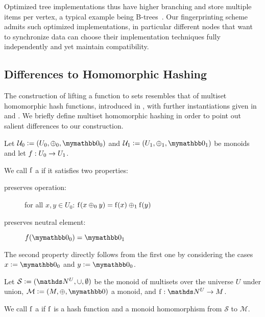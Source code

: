 Optimized tree implementations thus have higher branching and store multiple items per vertex, a typical example being B-trees~\cite{bayer2002organization}. Our fingerprinting scheme admits such optimized implementations, in particular different nodes that want to synchronize data can choose their implementation techniques fully independently and yet maintain compatibility.

\subsection{Differences to Homomorphic Hashing}

The construction of lifting a function to sets resembles that of multiset homomorphic hash functions, introduced in \cite{clarke2003incremental}, with further instantiations given in \cite{cathalo2009comparing} and \cite{maitin2017elliptic}. We briefly define multiset homomorphic hashing in order to point out salient differences to our construction.

\begin{definition}
Let $\mathcal{U}_0 \defeq (U_0, \groupaddsym_0, \neutraladd_0)$ and $\mathcal{U}_1 \defeq (U_1, \groupaddsym_1, \neutraladd_1)$ be monoids and let ${f}: {U_0} \rightarrow {U_1}$.

We call $\operatorname{f}$ a  if it satisfies two properties:

\begin{description}
  \item[preserves operation:] for all $x, y \in U_0$: $\operatorname{f}(x \oplus_0 y) = \operatorname{f}(x) \oplus_1 \operatorname{f}(y)$
  \item[preserves neutral element:] $f(\neutraladd_0) = \neutraladd_1$
\end{description}

The second property directly follows from the first one by considering the cases $x \defeq \neutraladd_0$ and $y \defeq \neutraladd_0$.
\end{definition}

\begin{definition}
Let $\mathcal{S} \defeq (\N^U, \cup, \emptyset)$ be the monoid of multisets over the universe $U$ under union, $\mathcal{M} \defeq (M, \groupaddsym, \neutraladd)$ a monoid, and $\fun{\f}{\N^U}{M}$.

We call $\operatorname{f}$ a  if $\operatorname{f}$ is a hash function and a monoid homomorphism from $\mathcal{S}$ to $\mathcal{M}$.
\end{definition}

